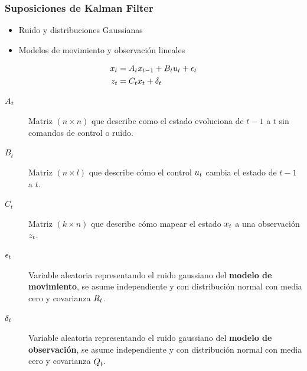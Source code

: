 \begin{frame}
	\frametitle{Suposiciones de Kalman Filter}
	\small
	\begin{itemize}
		\item Ruido y distribuciones Gaussianas
		\item Modelos de movimiento y observación lineales
	\end{itemize}
    
	\begin{align*}
		x_{t} &= A_{t} x_{t-1} + B_{t}u_{t} + \epsilon_{t}\\
		z_{t} &= C_{t} x_{t} + \delta_{t}
	\end{align*}
    
   	\begin{description}
        \item[$A_{t}$] Matriz $(n \times n)$ que describe como el estado evoluciona de $t-1$ a $t$ sin comandos de control o ruido.
        
        \item[$B_{t}$] Matriz $(n \times l)$ que describe cómo el control $u_{t}$ cambia el estado de $t-1$ a $t$.
        
        \item[$C_{t}$] Matriz $(k \times n)$ que describe cómo mapear el estado $x_{t}$ a una observación $z_{t}$.
        
        \item[$\epsilon_{t}$] Variable aleatoria representando el ruido gaussiano del {\bf modelo de movimiento}, se asume independiente y con distribución normal con media cero y covarianza $R_{t}$.
        
        \item[$\delta_{t}$] Variable aleatoria representando el ruido gaussiano del {\bf modelo de observación}, se asume independiente y con distribución normal con media cero y covarianza $Q_{t}$.
        
    \end{description}
    

\end{frame}


